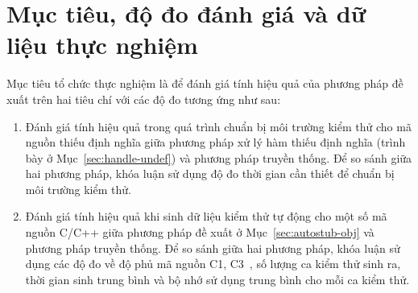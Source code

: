 

\section{Mục tiêu, độ đo đánh giá và dữ liệu thực nghiệm}
Mục tiêu tổ chức thực nghiệm là để đánh giá tính hiệu quả của phương pháp đề xuất trên hai tiêu chí với các độ đo tương ứng như sau:
\begin{enumerate}
    \item Đánh giá tính hiệu quả trong quá trình chuẩn bị môi trường kiểm thử cho mã nguồn thiếu định nghĩa giữa phương pháp xử lý hàm thiếu định nghĩa (trình bày ở Mục~\ref{sec:handle-undef}) và phương pháp truyền thống. Để so sánh giữa hai phương pháp, khóa luận sử dụng độ đo thời gian cần thiết để chuẩn bị môi trường kiểm thử.
    \item Đánh giá tính hiệu quả khi sinh dữ liệu kiểm thử tự động cho một số mã nguồn C/C++ giữa phương pháp đề xuất ở Mục~\ref{sec:autostub-obj} và phương pháp truyền thống. Để so sánh giữa hai phương pháp, khóa luận sử dụng các độ đo về độ phủ mã nguồn C1, C3~\cite{GiaoTrinhKiemThu}, số lượng ca kiểm thử sinh ra, thời gian sinh trung bình và bộ nhớ sử dụng trung bình cho mỗi ca kiểm thử.
\end{enumerate}


